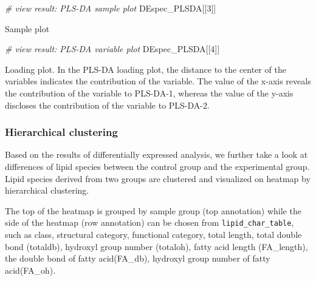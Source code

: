 \documentclass[]{article}
\newcommand{\hlnum}[1]{\textcolor[rgb]{0.816,0.125,0.439}{#1}}%
\newcommand{\hlcom}[1]{\textcolor[rgb]{0.502,0.502,0.502}{\textit{#1}}}%
\newcommand{\hlstd}[1]{\textcolor[rgb]{0.251,0.251,0.251}{#1}}%
\newenvironment{Shaded}{\begin{myshaded}}{\end{myshaded}}
\newcommand{\DecValTok}[1]{\hlnum{#1}}
\newcommand{\CommentTok}[1]{\hlcom{#1}}
\newcommand{\NormalTok}[1]{\hlstd{#1}}
\begin{document}
\begin{Shaded}
\begin{Highlighting}[]
\CommentTok{# view result: PLS-DA sample plot}
\NormalTok{DEspec_PLSDA[[}\DecValTok{3}\NormalTok{]]  }
\end{Highlighting}
\end{Shaded}

\label{fig:unnamed-chunk-26}Sample plot

\begin{Shaded}
\begin{Highlighting}[]
\CommentTok{# view result: PLS-DA variable plot}
\NormalTok{DEspec_PLSDA[[}\DecValTok{4}\NormalTok{]]     }
\end{Highlighting}
\end{Shaded}

\label{fig:unnamed-chunk-27}Loading plot. In the PLS-DA loading plot, the distance to the center of the variables indicates the contribution of the variable. The value of the x-axis reveals the contribution of the variable to PLS-DA-1, whereas the value of the y-axis discloses the contribution of the variable to PLS-DA-2.

\hypertarget{hierarchicalCluster}{%
\subsubsection{Hierarchical clustering}\label{hierarchicalCluster}}

Based on the results of differentially expressed analysis, we further take a look at differences of lipid species between the control group and the experimental group. Lipid species derived from two groups are clustered and visualized on heatmap by hierarchical clustering.

The top of the heatmap is grouped by sample group (top annotation) while the side of the heatmap (row annotation) can be chosen from \texttt{lipid\_char\_table}, such as class, structural category, functional category, total length, total double bond (totaldb), hydroxyl group number (totaloh), fatty acid length (FA\_length), the double bond of fatty acid(FA\_db), hydroxyl group number of fatty acid(FA\_oh).
\end{document}
